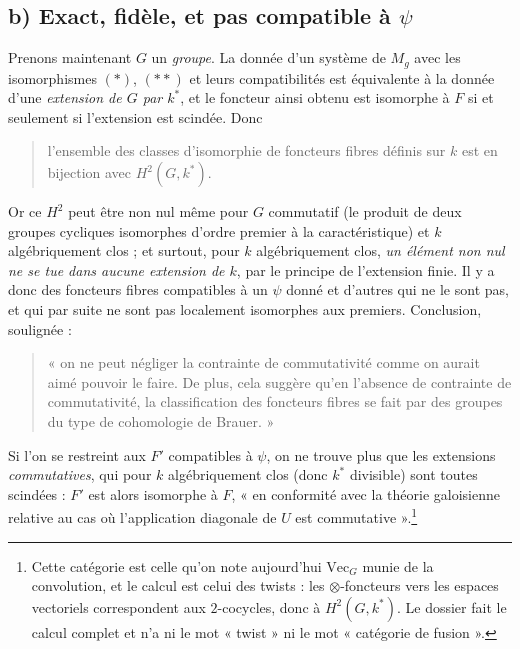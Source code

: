 \documentclass[11pt,a4paper]{article}
\begin{document}
\subsection*{b) Exact, fidèle, et pas compatible à $\psi$}

Prenons maintenant $G$ un \emph{groupe}. La donnée d'un système de $M_{g}$ avec
les isomorphismes $(*)$, $(**)$ et leurs compatibilités est équivalente à la
donnée d'une \emph{extension de $G$ par $k^{*}$}, et le foncteur ainsi obtenu
est isomorphe à $F$ si et seulement si l'extension est scindée. Donc
\begin{quote}
l'ensemble des classes d'isomorphie de foncteurs fibres définis sur $k$ est en
bijection avec $H^{2}(G, k^{*})$.
\end{quote}
Or ce $H^{2}$ peut être non nul même pour $G$ commutatif (le produit de deux
groupes cycliques isomorphes d'ordre premier à la caractéristique) et $k$
algébriquement clos ; et surtout, pour $k$ algébriquement clos, \emph{un
élément non nul ne se tue dans aucune extension de $k$}, par le principe de
l'extension finie. Il y a donc des foncteurs fibres compatibles à un $\psi$
donné et d'autres qui ne le sont pas, et qui par suite ne sont pas localement
isomorphes aux premiers. Conclusion, soulignée :
\begin{quote}
« on ne peut négliger la contrainte de commutativité comme on aurait aimé
pouvoir le faire. De plus, cela suggère qu'en l'absence de contrainte de
commutativité, la classification des foncteurs fibres se fait par des groupes
du type de cohomologie de Brauer. »
\end{quote}
Si l'on se restreint aux $F'$ compatibles à $\psi$, on ne trouve plus que les
extensions \emph{commutatives}, qui pour $k$ algébriquement clos (donc
$k^{*}$ divisible) sont toutes scindées : $F'$ est alors isomorphe à $F$,
« en conformité avec la théorie galoisienne relative au cas où l'application
diagonale de $U$ est commutative ».\footnote{Cette catégorie est celle qu'on
note aujourd'hui $\mathrm{Vec}_{G}$ munie de la convolution, et le calcul est
celui des twists : les $\otimes$-foncteurs vers les espaces vectoriels
correspondent aux $2$-cocycles, donc à $H^{2}(G, k^{*})$. Le dossier fait le
calcul complet et n'a ni le mot « twist » ni le mot « catégorie de fusion ».}
\end{document}
